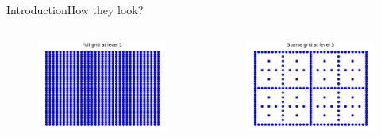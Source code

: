 \begin{frame}{Introduction}{How they look?}

    \begin{columns}
        \begin{column}{0.5\textwidth}
            \begin{figure}
                \centering
                \includegraphics[width=\textwidth]{figures/full_grid_level_5.pdf}
            \end{figure}
        \end{column}
        \begin{column}{0.5\textwidth}
            \begin{figure}
                \centering
                \includegraphics[width=\textwidth]{figures/sparse_grid_level_5.pdf}
            \end{figure}
        \end{column}
    \end{columns}

\end{frame}